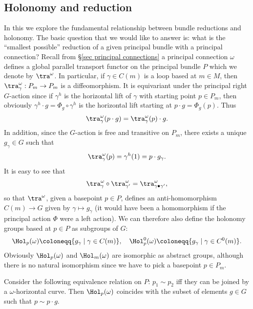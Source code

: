 \subsection{Holonomy and reduction}\label{sec holonomy}

In this \subsect we explore the fundamental relationship between bundle reductions and holonomy. The basic question that we would like to answer is: what is the ``smallest possible'' reduction of a given principal bundle with a principal connection? Recall from \S\ref{sec principal connections} a principal connection $\omega$ defines a global parallel transport functor on the principal bundle $P$ which we denote by $\tra^\omega$. In particular, if $\gamma\in C(m)$ is a loop based at $m\in M$, then $\tra^\omega_\gamma:P_m\to P_m$ is a diffeomorphism. It is equivariant under the principal right $G$-action since if $\gamma^h$ is the horizontal lift of $\gamma$ with starting point $p\in P_m$, then obviously $\gamma^h\cdot g=\Phi_g\circ\gamma^h$ is the horizontal lift starting at $p\cdot g=\Phi_g(p)$. Thus
\[\tra_\gamma^\omega(p\cdot g)=\tra_\gamma^\omega(p)\cdot g.\label{eq 1.7.4 RS2}\]
In addition, since the $G$-action is free and transitive on $P_m$, there exists a unique $g_\gamma\in G$ such that
\[\tra_\gamma^\omega(p)=\gamma^h(1)=p\cdot g_\gamma.\label{eq 1.7.5 RS2}\]
It is easy to see that
\[\tra_{\gamma}^\omega\circ\tra_{\gamma'}^\omega=\tra_{\gamma\bullet\gamma'}^\omega,\]
so that $\tra^\omega$, given a basepoint $p\in P$, defines an anti-homomorphism $C(m)\to G$ given by $\gamma\mapsto g_\gamma$ (it would have been a homomorphism if the principal action $\Phi$ were a left action). We can therefore also define the holonomy groups based at $p\in P$ as subgroups of $G$:
\[\Hol_p(\omega)\coloneqq \{g_\gamma \mid \gamma\in C(m)\}, \quad \Hol_p^0(\omega)\coloneqq\{g_\gamma \mid \gamma\in C^0(m)\}.\]
Obviously $\Hol_p(\omega)$ and $\Hol_m(\omega)$ are isomorphic as abstract groups, although there is no natural isomorphism since we have to pick a basepoint $p\in P_m$.

\begin{rem}\label{rem 1.7.7 RS2}
    Consider the following equivalence relation on $P$: $p_1\sim p_2$ iff they can be joined by a $\omega$-horizontal curve. Then $\Hol_p(\omega)$ coincides with the subset of elements $g\in G$ such that $p\sim p\cdot g$.
\end{rem}

